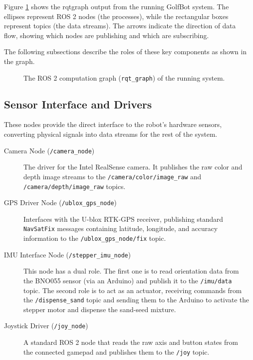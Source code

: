 Figure \ref{fig:ros2_computation_graph} shows the \gls{rqtgraph} output from the running GolfBot system. The ellipses represent ROS 2 nodes (the processes), while the rectangular boxes represent topics (the data streams). The arrows indicate the direction of data flow, showing which nodes are publishing and which are subscribing. 

The following subsections describe the roles of these key components as shown in the graph.

\begin{figure}[h!]
    \caption{The ROS 2 computation graph (\texttt{rqt\_graph}) of the running system.}
    \label{fig:ros2_computation_graph}
\end{figure}

\subsection{Sensor Interface and Drivers}
These nodes provide the direct interface to the robot's hardware sensors, converting physical signals into data streams for the rest of the system.
\begin{description}
    \item[Camera Node (\texttt{/camera\_node})] The driver for the Intel RealSense camera. It publishes the raw color and depth image streams to the \texttt{/camera/color/image\_raw} and \texttt{/camera/depth/image\_raw} topics.
    \item[GPS Driver Node (\texttt{/ublox\_gps\_node})] Interfaces with the U-blox RTK-GPS receiver, publishing standard \texttt{NavSatFix} messages containing latitude, longitude, and accuracy information to the \texttt{/ublox\_gps\_node/fix} topic.
    \item[IMU Interface Node (\texttt{/stepper\_imu\_node})] This node has a dual role. The first one is to read orientation data from the BNO055 sensor (via an Arduino) and publish it to the \texttt{/imu/data} topic. The second role is to act as an actuator, receiving commands from the \texttt{/dispense\_sand} topic and sending them to the Arduino to activate the stepper motor and dispense the sand-seed mixture.
    \item[Joystick Driver (\texttt{/joy\_node})] A standard ROS 2 node that reads the raw axis and button states from the connected gamepad and publishes them to the \texttt{/joy} topic.
\end{description}

